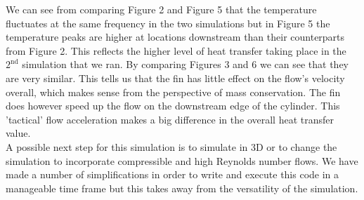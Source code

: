 We can see from comparing Figure 2 and Figure 5 that the temperature fluctuates at the same frequency in the two simulations but in Figure 5 the temperature peaks are higher at locations downstream than their counterparts from Figure 2. This reflects the higher level of heat transfer taking place in the $2^{\text{nd}}$ simulation that we ran. By comparing Figures 3 and 6 we can see that they are very similar. This tells us that the fin has little effect on the flow's velocity overall, which makes sense from the perspective of mass conservation. The fin does however speed up the flow on the downstream edge of the cylinder. This 'tactical' flow acceleration makes a big difference in the overall heat transfer value.  \\  

A possible next step for this simulation is to simulate in 3D or to change the simulation to incorporate compressible and high Reynolds number flows. We have made a number of simplifications in order to write and execute this code in a manageable time frame but this takes away from the versatility of the simulation. 







\clearpage